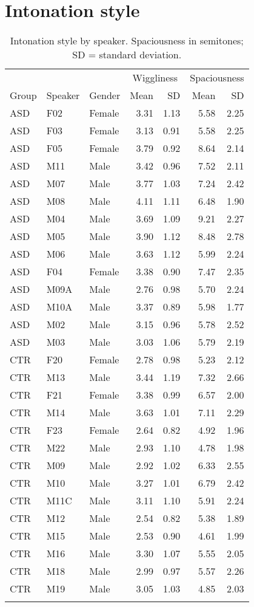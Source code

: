 \chapter{Intonation style}\label{appendix:a}

\begin{table}
\caption{\label{tab:WigSpacSpeakerTable}Intonation style by speaker. Spaciousness in semitones; SD = standard deviation.}
\begin{tabularx}{.8\textwidth}{XXlrrrr}
\lsptoprule
 &  &  & \multicolumn{2}{c}{Wiggliness} & \multicolumn{2}{c}{Spaciousness} \\
\cmidrule(r){4-5} \cmidrule(r){6-7}
Group & Speaker & Gender & Mean & SD & Mean & SD\\
\midrule
ASD & F02 & Female & 3.31 & 1.13 & 5.58 & 2.25\\
ASD & F03 & Female & 3.13 & 0.91 & 5.58 & 2.25\\
ASD & F05 & Female & 3.79 & 0.92 & 8.64 & 2.14\\
ASD & M11 & Male & 3.42 & 0.96 & 7.52 & 2.11\\
ASD & M07 & Male & 3.77 & 1.03 & 7.24 & 2.42\\
ASD & M08 & Male & 4.11 & 1.11 & 6.48 & 1.90\\
ASD & M04 & Male & 3.69 & 1.09 & 9.21 & 2.27\\
ASD & M05 & Male & 3.90 & 1.12 & 8.48 & 2.78\\
ASD & M06 & Male & 3.63 & 1.12 & 5.99 & 2.24\\
ASD & F04 & Female & 3.38 & 0.90 & 7.47 & 2.35\\
ASD & M09A & Male & 2.76 & 0.98 & 5.70 & 2.24\\
ASD & M10A & Male & 3.37 & 0.89 & 5.98 & 1.77\\
ASD & M02 & Male & 3.15 & 0.96 & 5.78 & 2.52\\
ASD & M03 & Male & 3.03 & 1.06 & 5.79 & 2.19\\
CTR & F20 & Female & 2.78 & 0.98 & 5.23 & 2.12\\
CTR & M13 & Male & 3.44 & 1.19 & 7.32 & 2.66\\
CTR & F21 & Female & 3.38 & 0.99 & 6.57 & 2.00\\
CTR & M14 & Male & 3.63 & 1.01 & 7.11 & 2.29\\
CTR & F23 & Female & 2.64 & 0.82 & 4.92 & 1.96\\
CTR & M22 & Male & 2.93 & 1.10 & 4.78 & 1.98\\
CTR & M09 & Male & 2.92 & 1.02 & 6.33 & 2.55\\
CTR & M10 & Male & 3.27 & 1.01 & 6.79 & 2.42\\
CTR & M11C & Male & 3.11 & 1.10 & 5.91 & 2.24\\
CTR & M12 & Male & 2.54 & 0.82 & 5.38 & 1.89\\
CTR & M15 & Male & 2.53 & 0.90 & 4.61 & 1.99\\
CTR & M16 & Male & 3.30 & 1.07 & 5.55 & 2.05\\
CTR & M18 & Male & 2.99 & 0.97 & 5.57 & 2.26\\
CTR & M19 & Male & 3.05 & 1.03 & 4.85 & 2.03\\
\lspbottomrule
\end{tabularx}
\end{table}


